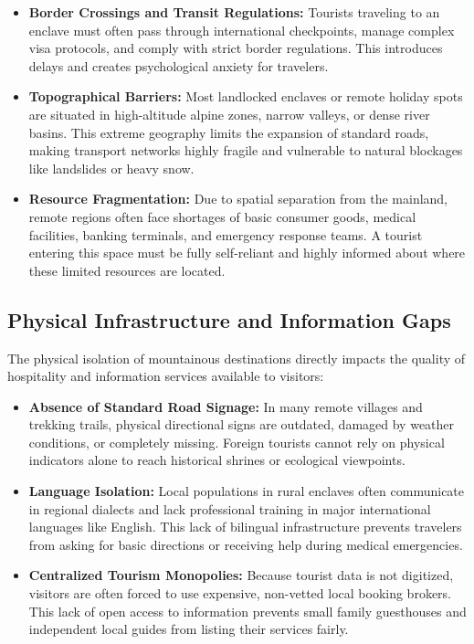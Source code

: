 \documentclass[12pt,a4paper,oneside]{report}
\begin{document}
\begin{itemize}[leftmargin=1.4em]
  \item \textbf{Border Crossings and Transit Regulations:} Tourists traveling to an
        enclave must often pass through international checkpoints, manage complex visa
        protocols, and comply with strict border regulations. This introduces delays and
        creates psychological anxiety for travelers.
  \item \textbf{Topographical Barriers:} Most landlocked enclaves or remote holiday spots
        are situated in high-altitude alpine zones, narrow valleys, or dense river basins.
        This extreme geography limits the expansion of standard roads, making transport
        networks highly fragile and vulnerable to natural blockages like landslides or
        heavy snow.
  \item \textbf{Resource Fragmentation:} Due to spatial separation from the mainland,
        remote regions often face shortages of basic consumer goods, medical facilities,
        banking terminals, and emergency response teams. A tourist entering this space
        must be fully self-reliant and highly informed about where these limited
        resources are located.
\end{itemize}

\subsection{Physical Infrastructure and Information Gaps}

The physical isolation of mountainous destinations directly impacts the quality of
hospitality and information services available to visitors:

\begin{itemize}[leftmargin=1.4em]
  \item \textbf{Absence of Standard Road Signage:} In many remote villages and trekking
        trails, physical directional signs are outdated, damaged by weather conditions, or
        completely missing. Foreign tourists cannot rely on physical indicators alone to
        reach historical shrines or ecological viewpoints.
  \item \textbf{Language Isolation:} Local populations in rural enclaves often communicate
        in regional dialects and lack professional training in major international
        languages like English. This lack of bilingual infrastructure prevents travelers
        from asking for basic directions or receiving help during medical emergencies.
  \item \textbf{Centralized Tourism Monopolies:} Because tourist data is not digitized,
        visitors are often forced to use expensive, non-vetted local booking brokers. This
        lack of open access to information prevents small family guesthouses and
        independent local guides from listing their services fairly.
\end{itemize}
\end{document}

